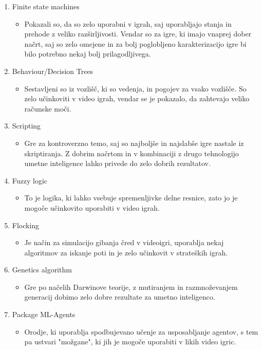 \documentclass[a4paper, 12pt]{book}
\begin{document}
\begin{enumerate}
    \item Finite state machines
        \begin{itemize}
            \item Pokazali so, da so zelo uporabni v igrah, saj uporabljajo stanja in prehode z veliko razširljivosti. Vendar so za igre, ki imajo vnaprej dober načrt, saj so zelo omejene in za bolj poglobljeno karakterizacijo igre bi bilo potrebno nekaj bolj prilagodljivega.
        \end{itemize}
    \item Behaviour/Decision Trees
        \begin{itemize}
            \item Sestavljeni so iz vozlišč, ki so vedenja, in pogojev za vsako vozlišče. So zelo učinkoviti v video igrah, vendar se je pokazalo, da zahtevajo veliko računske moči.
        \end{itemize}
    \item Scripting
        \begin{itemize}
            \item Gre za kontroverzno temo, saj so najboljše in najslabše igre nastale iz skriptiranja. Z dobrim načrtom in v kombinaciji z drugo tehnologijo umetne inteligence lahko privede do zelo dobrih rezultatov.
        \end{itemize}
    \item Fuzzy logic
        \begin{itemize}
            \item To je logika, ki lahko vsebuje spremenljivke delne resnice, zato jo je mogoče učinkovito uporabiti v video igrah.
        \end{itemize}
    \item Flocking
        \begin{itemize}
            \item Je način za simulacijo gibanja čred v videoigri, uporablja nekaj algoritmov za iskanje poti in je zelo učinkovit v strateških igrah.
        \end{itemize}
    \item Genetics algorithm
        \begin{itemize}
            \item Gre po načelih Darwinove teorije, z mutiranjem in razmnoževanjem generacij dobimo zelo dobre rezultate za umetno inteligenco.
        \end{itemize}
    \item Package ML-Agents
        \begin{itemize}
            \item Orodje, ki uporablja spodbujevano učenje za usposabljanje agentov, s tem pa ustvari "možgane", ki jih je mogoče uporabiti v likih video igric.
        \end{itemize}
\end{enumerate}
\end{document}
